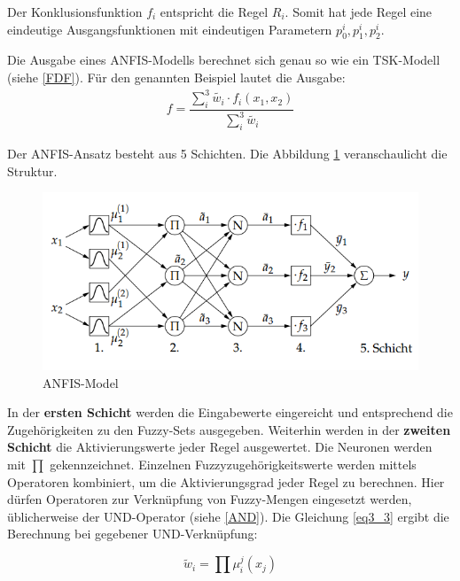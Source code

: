 Der Konklusionsfunktion $f_i$ entspricht die Regel $R_i$. Somit hat jede Regel eine eindeutige Ausgangsfunktionen mit eindeutigen Parametern $p_0^{i}, p_1^{i}, p_2^{i}$.

Die Ausgabe eines ANFIS-Modells berechnet sich genau so wie ein TSK-Modell (siehe \ref{FDF}). %
Für den genannten Beispiel lautet die Ausgabe:
\begin{align}
	f = \dfrac{\sum_{i}^{3} \tilde{w_i}\cdot f_i(x_1, x_2)}{\sum_{i}^{3} \tilde{w_i}}
\end{align}

Der ANFIS-Ansatz besteht aus 5 Schichten. Die Abbildung \ref{ANFIS_Abb} veranschaulicht die Struktur.

\begin{figure}[htbp]
	\centering
	\includegraphics[scale=0.5]{images/ANFIS_Abb.png}
	\caption{ANFIS-Model \cite{CIKruse:15}}\label{ANFIS_Abb}
\end{figure}

In der \textbf{ersten Schicht} werden die Eingabewerte eingereicht und entsprechend die Zugehörigkeiten zu den Fuzzy-Sets ausgegeben. Weiterhin werden in der \textbf{zweiten Schicht} die Aktivierungswerte jeder Regel ausgewertet. Die Neuronen werden mit $\prod$ gekennzeichnet. Einzelnen Fuzzyzugehörigkeitswerte werden mittels Operatoren kombiniert, um die Aktivierungsgrad jeder Regel zu berechnen. Hier dürfen Operatoren zur Verknüpfung von Fuzzy-Mengen eingesetzt werden, üblicherweise der UND-Operator (siehe \ref{AND}). Die Gleichung \ref{eq3_3} ergibt die Berechnung bei gegebener UND-Verknüpfung:

\begin{equation}\label{eq3_3}
	\tilde{w}_i = \prod \mu_i^j(x_j)
\end{equation}

